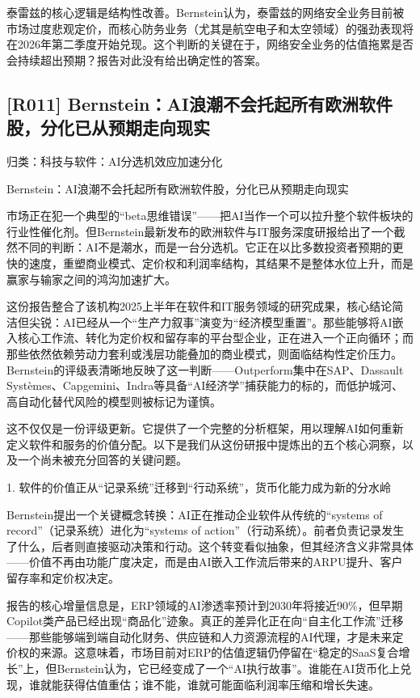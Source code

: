 \documentclass[11pt]{ctexart}
\begin{document}
泰雷兹的核心逻辑是结构性改善。Bernstein认为，泰雷兹的网络安全业务目前被市场过度悲观定价，而核心防务业务（尤其是航空电子和太空领域）的强劲表现将在2026年第二季度开始兑现。这个判断的关键在于，网络安全业务的估值拖累是否会持续超出预期？报告对此没有给出确定性的答案。

\subsection{[R011] Bernstein：AI浪潮不会托起所有欧洲软件股，分化已从预期走向现实}
{\small\color{refgray}归类：科技与软件：AI分选机效应加速分化}

Bernstein：AI浪潮不会托起所有欧洲软件股，分化已从预期走向现实

市场正在犯一个典型的“beta思维错误”——把AI当作一个可以拉升整个软件板块的行业性催化剂。但Bernstein最新发布的欧洲软件与IT服务深度研报给出了一个截然不同的判断：AI不是潮水，而是一台分选机。它正在以比多数投资者预期的更快的速度，重塑商业模式、定价权和利润率结构，其结果不是整体水位上升，而是赢家与输家之间的鸿沟加速扩大。

这份报告整合了该机构2025上半年在软件和IT服务领域的研究成果，核心结论简洁但尖锐：AI已经从一个“生产力叙事”演变为“经济模型重置”。那些能够将AI嵌入核心工作流、转化为定价权和留存率的平台型企业，正在进入一个正向循环；而那些依然依赖劳动力套利或浅层功能叠加的商业模式，则面临结构性定价压力。Bernstein的评级表清晰地反映了这一判断——Outperform集中在SAP、Dassault Systèmes、Capgemini、Indra等具备“AI经济学”捕获能力的标的，而低护城河、高自动化替代风险的模型则被标记为谨慎。

这不仅仅是一份评级更新。它提供了一个完整的分析框架，用以理解AI如何重新定义软件和服务的价值分配。以下是我们从这份研报中提炼出的五个核心洞察，以及一个尚未被充分回答的关键问题。

1. 软件的价值正从“记录系统”迁移到“行动系统”，货币化能力成为新的分水岭

Bernstein提出一个关键概念转换：AI正在推动企业软件从传统的“systems of record”（记录系统）进化为“systems of action”（行动系统）。前者负责记录发生了什么，后者则直接驱动决策和行动。这个转变看似抽象，但其经济含义非常具体——价值不再由功能广度决定，而是由AI嵌入工作流后带来的ARPU提升、客户留存率和定价权决定。

报告的核心增量信息是，ERP领域的AI渗透率预计到2030年将接近90\%，但早期Copilot类产品已经出现“商品化”迹象。真正的差异化正在向“自主化工作流”迁移——那些能够端到端自动化财务、供应链和人力资源流程的AI代理，才是未来定价权的来源。这意味着，市场目前对ERP的估值逻辑仍停留在“稳定的SaaS复合增长”上，但Bernstein认为，它已经变成了一个“AI执行故事”。谁能在AI货币化上兑现，谁就能获得估值重估；谁不能，谁就可能面临利润率压缩和增长失速。
\end{document}
